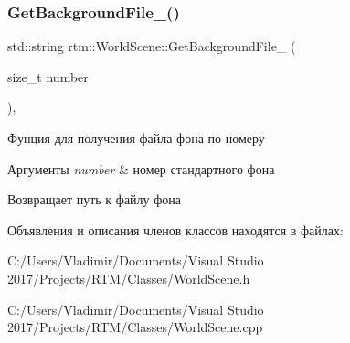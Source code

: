\subsubsection{\texorpdfstring{Get\+Background\+File\+\_\+()}{GetBackgroundFile\_()}}
{\footnotesize\ttfamily std\+::string rtm\+::\+World\+Scene\+::\+Get\+Background\+File\+\_\+ (\begin{DoxyParamCaption}\item[{size\+\_\+t}]{number }\end{DoxyParamCaption})\hspace{0.3cm}{\ttfamily [static]}, {\ttfamily [private]}}

Фунция для получения файла фона по номеру 
\begin{DoxyParams}{Аргументы}
{\em number} & номер стандартного фона \\
\hline
\end{DoxyParams}
\begin{DoxyReturn}{Возвращает}
путь к файлу фона 
\end{DoxyReturn}


Объявления и описания членов классов находятся в файлах\+:\begin{DoxyCompactItemize}
\item 
C\+:/\+Users/\+Vladimir/\+Documents/\+Visual Studio 2017/\+Projects/\+R\+T\+M/\+Classes/World\+Scene.\+h\item 
C\+:/\+Users/\+Vladimir/\+Documents/\+Visual Studio 2017/\+Projects/\+R\+T\+M/\+Classes/World\+Scene.\+cpp\end{DoxyCompactItemize}

